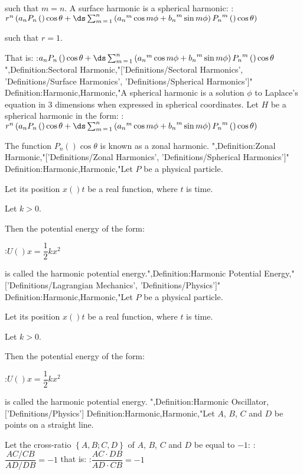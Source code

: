 such that $m = n$.
A surface harmonic is a spherical harmonic:
:$r^n \left( a_n P_n \left(   \right){\cos \theta} + \ds \sum_{m \mathop = 1}^n \left(  {a_n}^m \cos m \phi + {b_n}^m \sin m \phi \right)  {P_n}^m \left(   \right){\cos \theta}  \right)$

such that $r = 1$.

That is:
:$a_n P_n \left(   \right){\cos \theta} + \ds \sum_{m \mathop = 1}^n \left(  {a_n}^m \cos m \phi + {b_n}^m \sin m \phi \right)  {P_n}^m \left(   \right){\cos \theta}$
",Definition:Sectoral Harmonic,"['Definitions/Sectoral Harmonics', 'Definitions/Surface Harmonics', 'Definitions/Spherical Harmonics']"
Definition:Harmonic,Harmonic,"A spherical harmonic is a solution $\phi$ to Laplace's equation in $3$ dimensions when expressed in spherical coordinates.
Let $H$ be a spherical harmonic in the form:
:$r^n \left( a_n P_n \left(   \right){\cos \theta} + \ds \sum_{m \mathop = 1}^n \left(  {a_n}^m \cos m \phi + {b_n}^m \sin m \phi \right)  {P_n}^m \left(   \right){\cos \theta}  \right)$

The function $P_n \left(   \right){\cos \theta}$ is known as a zonal harmonic.
",Definition:Zonal Harmonic,"['Definitions/Zonal Harmonics', 'Definitions/Spherical Harmonics']"
Definition:Harmonic,Harmonic,"Let $P$ be a physical particle.

Let its position $x \left(   \right)t$ be a real function, where $t$ is time.

Let $k > 0$.


Then the potential energy of the form:

:$U \left(   \right)x = \dfrac 1 2 k x^2$

is called the harmonic potential energy.",Definition:Harmonic Potential Energy,"['Definitions/Lagrangian Mechanics', 'Definitions/Physics']"
Definition:Harmonic,Harmonic,"Let $P$ be a physical particle.

Let its position $x \left(   \right)t$ be a real function, where $t$ is time.

Let $k > 0$.


Then the potential energy of the form:

:$U \left(   \right)x = \dfrac 1 2 k x^2$

is called the harmonic potential energy.
",Definition:Harmonic Oscillator,['Definitions/Physics']
Definition:Harmonic,Harmonic,"Let $A$, $B$, $C$ and $D$ be points on a straight line.

Let the cross-ratio $\left\lbrace A, B; C, D \right\rbrace$ of $A$, $B$, $C$ and $D$ be equal to $-1$:
:$\dfrac {AC / CB} {AD / DB} = -1$
that is:
:$\dfrac {AC \cdot DB} {AD \cdot CB} = -1$


